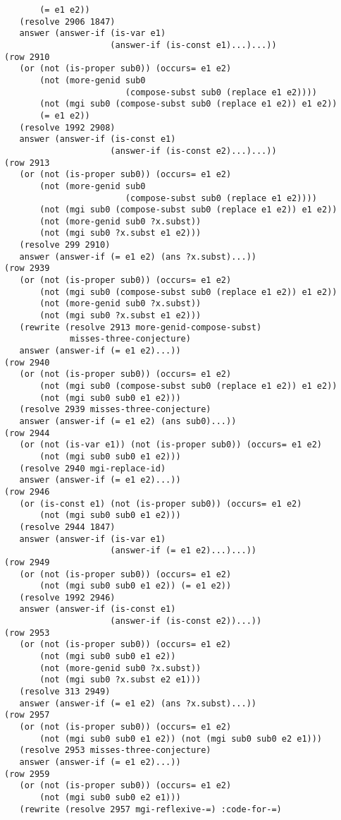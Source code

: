 \documentclass[runningheads]{llncs}
\begin{document}
\begin{verbatim}
       (= e1 e2))
   (resolve 2906 1847)
   answer (answer-if (is-var e1)
                     (answer-if (is-const e1)...)...))
(row 2910
   (or (not (is-proper sub0)) (occurs= e1 e2)
       (not (more-genid sub0 
                        (compose-subst sub0 (replace e1 e2))))
       (not (mgi sub0 (compose-subst sub0 (replace e1 e2)) e1 e2))
       (= e1 e2))
   (resolve 1992 2908)
   answer (answer-if (is-const e1)
                     (answer-if (is-const e2)...)...))
(row 2913
   (or (not (is-proper sub0)) (occurs= e1 e2)
       (not (more-genid sub0 
                        (compose-subst sub0 (replace e1 e2))))
       (not (mgi sub0 (compose-subst sub0 (replace e1 e2)) e1 e2))
       (not (more-genid sub0 ?x.subst)) 
       (not (mgi sub0 ?x.subst e1 e2)))
   (resolve 299 2910)
   answer (answer-if (= e1 e2) (ans ?x.subst)...))
(row 2939
   (or (not (is-proper sub0)) (occurs= e1 e2)
       (not (mgi sub0 (compose-subst sub0 (replace e1 e2)) e1 e2))
       (not (more-genid sub0 ?x.subst)) 
       (not (mgi sub0 ?x.subst e1 e2)))
   (rewrite (resolve 2913 more-genid-compose-subst) 
             misses-three-conjecture)
   answer (answer-if (= e1 e2)...))
(row 2940
   (or (not (is-proper sub0)) (occurs= e1 e2)
       (not (mgi sub0 (compose-subst sub0 (replace e1 e2)) e1 e2))
       (not (mgi sub0 sub0 e1 e2)))
   (resolve 2939 misses-three-conjecture)
   answer (answer-if (= e1 e2) (ans sub0)...))
(row 2944
   (or (not (is-var e1)) (not (is-proper sub0)) (occurs= e1 e2)
       (not (mgi sub0 sub0 e1 e2)))
   (resolve 2940 mgi-replace-id)
   answer (answer-if (= e1 e2)...))
(row 2946
   (or (is-const e1) (not (is-proper sub0)) (occurs= e1 e2)
       (not (mgi sub0 sub0 e1 e2)))
   (resolve 2944 1847)
   answer (answer-if (is-var e1)
                     (answer-if (= e1 e2)...)...))
(row 2949
   (or (not (is-proper sub0)) (occurs= e1 e2)
       (not (mgi sub0 sub0 e1 e2)) (= e1 e2))
   (resolve 1992 2946)
   answer (answer-if (is-const e1)
                     (answer-if (is-const e2))...))
(row 2953
   (or (not (is-proper sub0)) (occurs= e1 e2)
       (not (mgi sub0 sub0 e1 e2)) 
       (not (more-genid sub0 ?x.subst))
       (not (mgi sub0 ?x.subst e2 e1)))
   (resolve 313 2949)
   answer (answer-if (= e1 e2) (ans ?x.subst)...))
(row 2957
   (or (not (is-proper sub0)) (occurs= e1 e2)
       (not (mgi sub0 sub0 e1 e2)) (not (mgi sub0 sub0 e2 e1)))
   (resolve 2953 misses-three-conjecture)
   answer (answer-if (= e1 e2)...))
(row 2959
   (or (not (is-proper sub0)) (occurs= e1 e2)
       (not (mgi sub0 sub0 e2 e1)))
   (rewrite (resolve 2957 mgi-reflexive-=) :code-for-=)

\end{verbatim}
\end{document}

